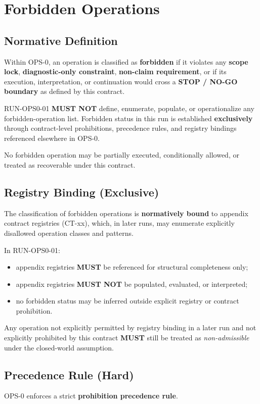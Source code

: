 ﻿\section{Forbidden Operations}

\subsection{Normative Definition}
Within OPS-0, an operation is classified as \textbf{forbidden} if it violates any
\textbf{scope lock}, \textbf{diagnostic-only constraint}, \textbf{non-claim requirement},
or if its execution, interpretation, or continuation would cross a
\textbf{STOP / NO-GO boundary} as defined by this contract.

RUN-OPS0-01 \textbf{MUST NOT} define, enumerate, populate, or operationalize any forbidden-operation list.
Forbidden status in this run is established \textbf{exclusively} through contract-level prohibitions,
precedence rules, and registry bindings referenced elsewhere in OPS-0.

No forbidden operation may be partially executed, conditionally allowed, or treated as recoverable
under this contract.

\subsection{Registry Binding (Exclusive)}
The classification of forbidden operations is \textbf{normatively bound} to appendix contract registries (CT-xx),
which, in later runs, may enumerate explicitly disallowed operation classes and patterns.

In RUN-OPS0-01:
\begin{itemize}
  \item appendix registries \textbf{MUST} be referenced for structural completeness only;
  \item appendix registries \textbf{MUST NOT} be populated, evaluated, or interpreted;
  \item no forbidden status may be inferred outside explicit registry or contract prohibition.
\end{itemize}

Any operation not explicitly permitted by registry binding in a later run
and not explicitly prohibited by this contract
\textbf{MUST} still be treated as \emph{non-admissible} under the closed-world assumption.

\subsection{Precedence Rule (Hard)}
OPS-0 enforces a strict \textbf{prohibition precedence rule}.

